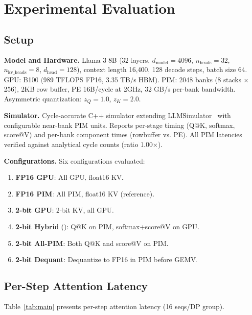 \section{Experimental Evaluation}

\subsection{Setup}

\textbf{Model and Hardware.} Llama-3-8B (32 layers, $d_{\text{model}}\!=\!4096$, $n_{\text{heads}}\!=\!32$, $n_{\text{kv\_heads}}\!=\!8$, $d_{\text{head}}\!=\!128$), context length 16,400, 128 decode steps, batch size 64.
GPU: B100 (989 TFLOPS FP16, 3.35 TB/s HBM).
PIM: 2048 banks (8 stacks $\times$ 256), 2KB row buffer, PE 16B/cycle at 2GHz, 32 GB/s per-bank bandwidth.
Asymmetric quantization: $z_Q\!=\!1.0$, $z_K\!=\!2.0$.

\textbf{Simulator.} Cycle-accurate C++ simulator extending LLMSimulator~\cite{duplex} with configurable near-bank PIM units.
Reports per-stage timing (Q@K, softmax, score@V) and per-bank component times (rowbuffer vs. PE).
All PIM latencies verified against analytical cycle counts (ratio 1.00$\times$).

\textbf{Configurations.} Six configurations evaluated:
\begin{enumerate}
\item \textbf{FP16 GPU}: All GPU, float16 KV.
\item \textbf{FP16 PIM}: All PIM, float16 KV (reference).
\item \textbf{2-bit GPU}: 2-bit KV, all GPU.
\item \textbf{2-bit Hybrid} (\pimattn{}): Q@K on PIM, softmax+score@V on GPU.
\item \textbf{2-bit All-PIM}: Both Q@K and score@V on PIM.
\item \textbf{2-bit Dequant}: Dequantize to FP16 in PIM before GEMV.
\end{enumerate}

\subsection{Per-Step Attention Latency}

Table~\ref{tab:main} presents per-step attention latency (16 seqs/DP group).

